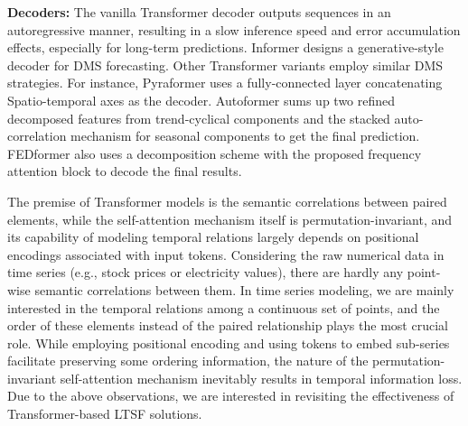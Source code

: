 \noindent\textbf{Decoders:}
The vanilla Transformer decoder outputs sequences in an autoregressive manner, resulting in a slow inference speed and error accumulation effects, especially for long-term predictions.
%
Informer designs a generative-style decoder for DMS forecasting. Other Transformer variants employ similar DMS strategies. 
%
For instance, Pyraformer uses a fully-connected layer concatenating Spatio-temporal axes as the decoder.
%
Autoformer sums up two refined decomposed features from trend-cyclical components and the stacked auto-correlation mechanism for seasonal components to get the final prediction. FEDformer also uses a decomposition scheme with the proposed frequency attention block to decode the final results.
%


The premise of Transformer models is the semantic correlations between paired elements, while the self-attention mechanism itself is permutation-invariant, and its capability of modeling temporal relations largely depends on positional encodings associated with input tokens. Considering the raw numerical data in time series (e.g., stock prices or electricity values), there are hardly any point-wise semantic correlations between them. In time series modeling, we are mainly interested in the temporal relations among a continuous set of points, and the order of these elements instead of the paired relationship plays the most crucial role. While employing positional encoding and using tokens to embed sub-series facilitate preserving some ordering information, the nature of the permutation-invariant self-attention mechanism inevitably results in temporal information loss. Due to the above observations, we are interested in revisiting the effectiveness of Transformer-based LTSF solutions. 
